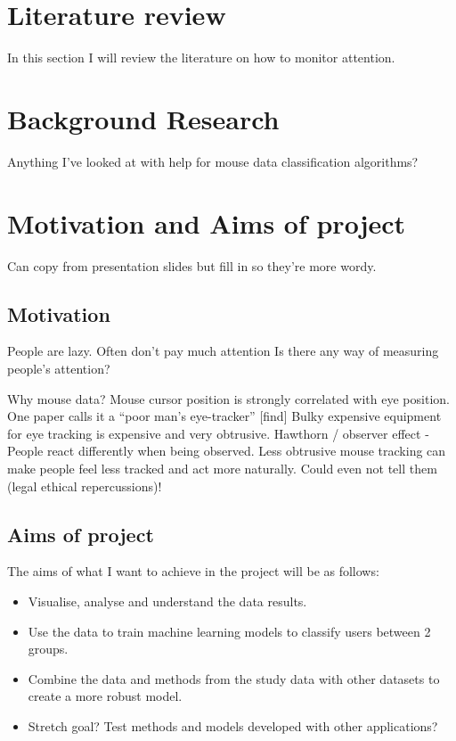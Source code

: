 \documentclass{article}
\begin{document}
\section{Literature review}

In this section I will review the literature on how to monitor attention.


\section{Background Research}
Anything I've looked at with help for mouse data classification algorithms? 


\section{Motivation and Aims of project}
Can copy from presentation slides but fill in so they're more wordy.

\subsection{Motivation}

People are lazy. 
Often don't pay much attention 
Is there any way of measuring people's attention?

Why mouse data?
Mouse cursor position is strongly correlated with eye position. 
One paper calls it a “poor man's eye-tracker” [find]
Bulky expensive equipment for eye tracking is expensive and very obtrusive.
Hawthorn / observer effect - People react differently when being observed. 
Less obtrusive mouse tracking can make people feel less tracked and act more naturally. 
Could even not tell them (legal ethical repercussions)!

\subsection{Aims of project}

The aims of what I want to achieve in the project will be as follows:
\begin{itemize}
    \item Visualise, analyse and understand the data results.
    \item Use the data to train machine learning models to classify users between 2 groups.
    \item Combine the data and methods from the study data with other datasets to create a more robust model.
    \item Stretch goal? Test methods and models developed with other applications?
\end{itemize}
\end{document}
